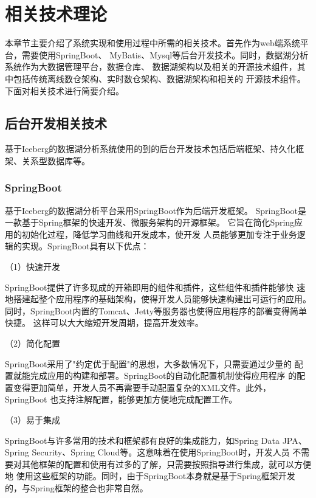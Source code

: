 
\chapter{相关技术理论}

本章节主要介绍了系统实现和使用过程中所需的相关技术。首先作为web端系统平台，需要使用SpringBoot、
MyBatis、Mysql等后台开发技术。同时，数据湖分析系统作为大数据管理平台，数据仓库、
数据湖架构以及相关的开源技术组件，其中包括传统离线数仓架构、实时数仓架构、数据湖架构和相关的
开源技术组件。下面对相关技术进行简要介绍。

\section{后台开发相关技术}

基于Iceberg的数据湖分析系统使用的到的后台开发技术包括后端框架、持久化框架、关系型数据库等。

\subsection{SpringBoot}

基于Iceberg的数据湖分析平台采用SpringBoot作为后端开发框架\cite{21,41}。
SpringBoot是一款基于Spring框架的快速开发、微服务架构的开源框架。
它旨在简化Spring应用的初始化过程，降低学习曲线和开发成本，使开发
人员能够更加专注于业务逻辑的实现。SpringBoot具有以下优点：

（1）快速开发

SpringBoot提供了许多现成的开箱即用的组件和插件，这些组件和插件能够快
速地搭建起整个应用程序的基础架构，使得开发人员能够快速构建出可运行的应用。
同时，SpringBoot内置的Tomcat、Jetty等服务器也使得应用程序的部署变得简单快捷。
这样可以大大缩短开发周期，提高开发效率。

（2）简化配置

SpringBoot采用了"约定优于配置"的思想，大多数情况下，只需要通过少量的
配置就能完成应用的构建和部署。SpringBoot的自动化配置机制使得应用程序
的配置变得更加简单，开发人员不再需要手动配置复杂的XML文件。此外，SpringBoot
也支持注解配置，能够更加方便地完成配置工作。

（3）易于集成

SpringBoot与许多常用的技术和框架都有良好的集成能力，如Spring Data JPA、
Spring Security、Spring Cloud等。这意味着在使用SpringBoot时，开发人员
不需要对其他框架的配置和使用有过多的了解，只需要按照指导进行集成，就可以方便地
使用这些框架的功能。同时，由于SpringBoot本身就是基于Spring框架开发的，与Spring框架的整合也非常自然。

